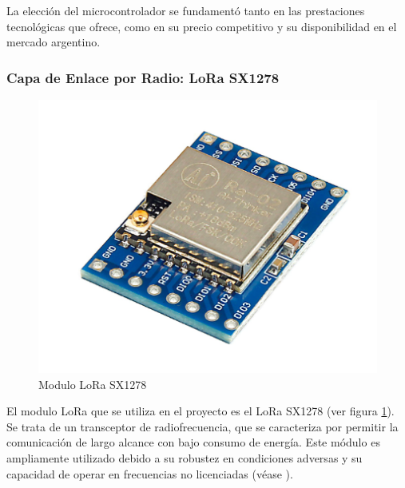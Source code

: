 La elección del microcontrolador se fundamentó tanto en las prestaciones tecnológicas que ofrece, como en su precio competitivo y su disponibilidad en el mercado argentino.

\subsubsection{Capa de Enlace por Radio: LoRa SX1278}

\begin{figure}[H]
	\centering
	\includegraphics[scale=1]{./Figures/Hardware/Modulos/LoRa.png}
	\caption{Modulo LoRa SX1278}
	\label{fig:LoRa}
\end{figure}

\label{sec:LoRa}
El modulo LoRa que se utiliza en el proyecto es el LoRa SX1278 (ver figura \ref{fig:LoRa}). Se trata de un transceptor de radiofrecuencia, que se caracteriza por permitir la comunicación de largo alcance con bajo consumo de energía. Este módulo es ampliamente utilizado debido a su robustez en condiciones adversas y su capacidad de operar en frecuencias no licenciadas (véase \cite{LoraDatasheet}).

